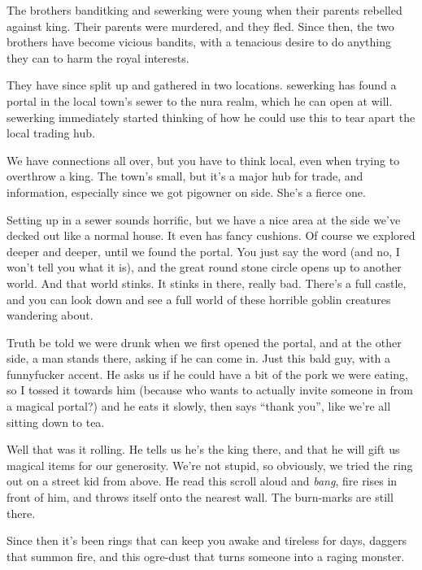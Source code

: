 \begin{multicols}{2}

The brothers \gls{banditking} and \gls{sewerking} were young when their parents rebelled against \gls{king}.
Their parents were murdered, and they fled.
Since then, the two brothers have become vicious bandits, with a tenacious desire to do anything they can to harm the royal interests.

They have since split up and gathered in two locations.
\Gls{sewerking} has found a portal in the local town's sewer to the nura realm, which he can open at will.
\Gls{sewerking} immediately started thinking of how he could use this to tear apart the local trading hub.

\begin{exampletext}

	We have connections all over, but you have to think local, even when trying to overthrow a king.  The town's small, but it's a major hub for trade, and information, especially since we got \gls{pigowner} on side.  She's a fierce one.

	Setting up in a sewer sounds horrific, but we have a nice area at the side we've decked out like a normal house.
	It even has fancy cushions.
	Of course we explored deeper and deeper, until we found the portal.
	You just say the word (and no, I won't tell you what it is), and the great round stone circle opens up to another world.
	And that world stinks.
	It stinks in there, really bad.
	There's a full castle, and you can look down and see a full world of these horrible goblin creatures wandering about.

	Truth be told we were drunk when we first opened the portal, and at the other side, a man stands there, asking if he can come in.
	Just this bald guy, with a funnyfucker accent.
	He asks us if he could have a bit of the pork we were eating, so I tossed it towards him (because who wants to actually invite someone in from a magical portal?) and he eats it slowly, then says ``thank you'', like we're all sitting down to tea.

	Well that was it rolling.  He tells us he's the king there, and that he will gift us magical items for our generosity.  We're not stupid, so obviously, we tried the ring out on a street kid from above.  He read this scroll aloud and \emph{bang}, fire rises in front of him, and throws itself onto the nearest wall.  The burn-marks are still there.

	Since then it's been rings that can keep you awake and tireless for days, daggers that summon fire, and this ogre-dust that turns someone into a raging monster.


\end{exampletext}
\end{multicols}
